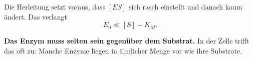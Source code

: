 \begin{warnung}
Die Herleitung setzt voraus, dass $[ES]$ sich rasch einstellt und danach kaum ändert. Das verlangt
\[ E_0 \ll [S] + K_M . \]

\begin{center}
\begin{minipage}{0.9\textwidth}
\textbf{Das Enzym muss selten sein gegenüber dem Substrat.} In der Zelle trifft das oft  zu: Manche Enzyme liegen in ähnlicher Menge vor wie ihre Substrate.
\end{minipage}
\end{center}

\begin{center}
\begin{minipage}{0.88\textwidth}
\end{minipage}
\end{center}
\end{warnung}

